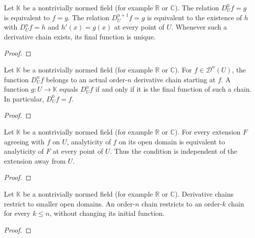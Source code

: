 \begin{supporting}

\begin{theorem}
\label{thm:open-domain-iterated-derivative}
\leanok
Let $\mathbb K$ be a nontrivially normed field (for example $\mathbb R$ or $\mathbb C$).
The relation $D_U^0f=g$ is equivalent to $f=g$.
The relation $D_U^{n+1}f=g$ is equivalent to the existence of $h$ with
$D_U^nf=h$ and $h'(x)=g(x)$ at every point of $U$.
Whenever such a derivative chain exists, its final function is unique.
\end{theorem}
\begin{proof}
\leanok
\end{proof}

\begin{theorem}
\label{thm:open-domain-derivative-value}
\leanok
Let $\mathbb K$ be a nontrivially normed field (for example $\mathbb R$ or $\mathbb C$).
For $f\in\mathcal D^n(U)$, the function $D_U^nf$ belongs to an actual
order-$n$ derivative chain starting at $f$. A function $g:U\to\mathbb K$
equals $D_U^nf$ if and only if it is the final function of such a chain.
In particular, $D_U^0f=f$.
\end{theorem}
\begin{proof}
\leanok
\end{proof}

\begin{theorem}
\label{thm:open-domain-analytic}
\leanok
Let $\mathbb K$ be a nontrivially normed field (for example $\mathbb R$ or $\mathbb C$).
For every extension $F$ agreeing with $f$ on $U$, analyticity of $f$ on
its open domain is equivalent to analyticity of $F$ at every point of $U$.
Thus the condition is independent of the extension away from $U$.
\end{theorem}
\begin{proof}
\leanok
\end{proof}

\begin{theorem}
\label{thm:open-domain-derivative-restriction}
\leanok
Let $\mathbb K$ be a nontrivially normed field (for example $\mathbb R$ or $\mathbb C$).
Derivative chains restrict to smaller open domains. An order-$n$ chain restricts to an order-$k$ chain for every $k\le n$, without changing its initial function.
\end{theorem}
\begin{proof}
\leanok
\end{proof}


\end{supporting}
